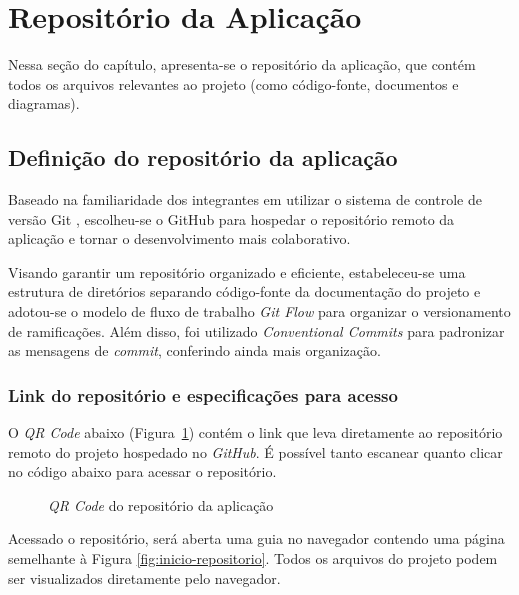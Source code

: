 \section{Repositório da Aplicação}

Nessa seção do capítulo, apresenta-se o repositório da aplicação, que contém todos os arquivos relevantes ao projeto (como código-fonte, documentos e diagramas).

\subsection{Definição do repositório da aplicação}

Baseado na familiaridade dos integrantes em utilizar o sistema de controle de versão Git \cite{git-2025}, escolheu-se o GitHub \cite{github-2025} para hospedar o repositório remoto da aplicação e tornar o desenvolvimento mais colaborativo.

Visando garantir um repositório organizado e eficiente, estabeleceu-se uma estrutura de diretórios separando código-fonte da documentação do projeto e adotou-se o modelo de fluxo de trabalho \textit{Git Flow} \cite{gitflow-2023} para organizar o versionamento de ramificações. Além disso, foi utilizado \textit{Conventional Commits} \cite{convcommits-2025} para padronizar as mensagens de \textit{commit}, conferindo ainda mais organização.

\subsubsection{Link do repositório e especificações para acesso}

O \emph{QR Code} abaixo (Figura~\ref{fig:qrcode-repositorio}) contém o link que leva diretamente ao repositório remoto do projeto hospedado no \emph{GitHub}. É possível tanto escanear quanto clicar no código abaixo para acessar o repositório.

\begin{figure}[h]
	\centering
		\caption{\emph{QR Code} do repositório da aplicação}
		\label{fig:qrcode-repositorio}
\end{figure}

Acessado o repositório, será aberta uma guia no navegador contendo uma página semelhante à Figura \ref{fig:inicio-repositorio}. Todos os arquivos do projeto podem ser visualizados diretamente pelo navegador.

